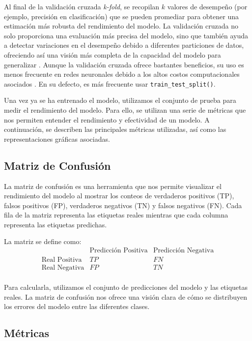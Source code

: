 Al final de la validación cruzada \textit{k-fold}, se recopilan $k$ valores de desempeño (por ejemplo, precisión en clasificación) que se pueden promediar para obtener una estimación más robusta del rendimiento del modelo. La validación cruzada no solo proporciona una evaluación más precisa del modelo, sino que también ayuda a detectar variaciones en el desempeño debido a diferentes particiones de datos, ofreciendo así una visión más completa de la capacidad del modelo para generalizar \citep{muller2016introduction}. Aunque la validación cruzada ofrece bastantes beneficios, su uso es menos frecuente en redes neuronales debido a los altos costos computacionales asociados \citep{geron2022hands}. En su defecto, es más frecuente usar \lstinline|train_test_split()|.



Una vez ya se ha entrenado el modelo, utilizamos el conjunto de prueba para medir el rendimiento del modelo. Para ello, se utilizan una serie de métricas que nos permiten entender el rendimiento y efectividad de un modelo. A continuación, se describen las principales métricas utilizadas, así como las representaciones gráficas asociadas.

\subsection{Matriz de Confusión}

La matriz de confusión es una herramienta que nos permite visualizar el rendimiento del modelo al mostrar los conteos de verdaderos positivos (TP), falsos positivos (FP), verdaderos negativos (TN) y falsos negativos (FN). Cada fila de la matriz representa las etiquetas reales mientras que cada columna representa las etiquetas predichas.

La matriz se define como:
\[
\begin{array}{c|cc}
 & \text{Predicción Positiva} & \text{Predicción Negativa} \\
\hline
\text{Real Positiva} & TP & FN \\
\text{Real Negativa} & FP & TN \\
\end{array}
\]

Para calcularla, utilizamos el conjunto de predicciones del modelo y las etiquetas reales. La matriz de confusión nos ofrece una visión clara de cómo se distribuyen los errores del modelo entre las diferentes clases.

\subsection{Métricas}


